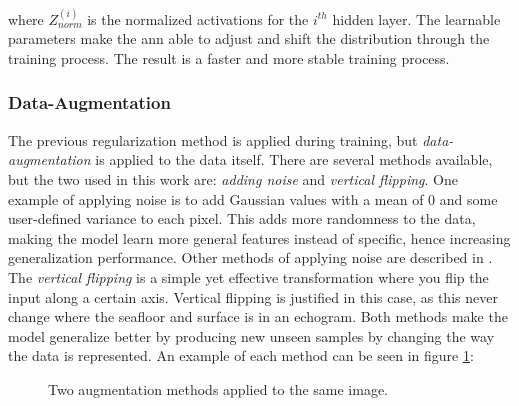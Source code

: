     where $Z^{(i)}_{norm}$ is the normalized activations for the $i^{th}$ hidden layer. The learnable parameters make the \gls{ann} able to adjust and shift the distribution through the training process. The result is a faster and more stable training process. 

\subsubsection{Data-Augmentation}
    The previous regularization method is applied during training, but \textit{data-augmentation} is applied to the data itself\cite{kukavcka2017_regularization}. There are several methods available, but the two used in this work are: \textit{adding noise} and \textit{vertical flipping}. One example of applying noise is to add Gaussian values with a mean of 0 and some user-defined variance to each pixel. This adds more randomness to the data, making the model learn more general features instead of specific, hence increasing generalization performance. Other methods of applying noise are described in \citeauthor{kukavcka2017_regularization}\cite{kukavcka2017_regularization}.  The \textit{vertical flipping} is a simple yet effective transformation where you flip the input along a certain axis. Vertical flipping is justified in this case, as this never change where the seafloor and surface is in an echogram. Both methods make the model generalize better by producing new unseen samples by changing the way the data is represented.  An example of each method can be seen in figure \ref{data augmentation fig}:
    
    \begin{figure}[H]
        \centering
        
        
        
        
        \caption[Two data augmentation examples]{Two augmentation methods applied to the same image.}
        \label{data augmentation fig}
        
        \end{figure}
    
    
\clearpage
